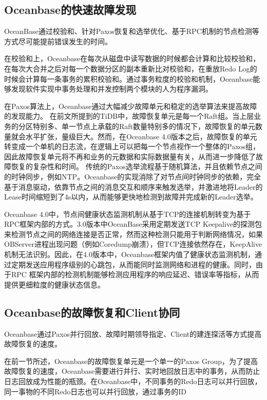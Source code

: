 \subsection{Oceanbase的快速故障发现}

OceanBase通过校验和、针对Paxos恢复和选举优化、基于RPC机制的节点检测等方式尽可能提前错误发生的时间。

在校验和上，Oceanbase在每次从磁盘中读写数据的时候都会计算和比较校验和，在每次大合并之后对每一个数据分区的副本重新比对校验和，在重放Redo Log的时候会计算每一条事务的累积校验和。通过事务粒度的校验和机制，Oceanbase能够发现软件实现中事务处理和并发控制两个模块的人为程序漏洞。

在Paxos算法上，Oceanbase通过大幅减少故障单元和稳定的选举算法来提高故障的发现能力。
在前文所提到的TiDB中，故障恢复单元是每一个Raft组。当上层业务的分区特别多、单一节点上承载的Raft数量特别多的情况下，故障恢复的单元数量就会水平扩张，量级巨大。然而，在Oceanbase 4.0版本之后，故障恢复的单元转变成一个单机的日志流，在逻辑上可以把每一个节点视作一个整体的Paxos组，因此故障恢复单元将不再和业务的元数据和实际数据量有关，从而进一步降低了故障恢复的复杂性和时间。
传统的Paxos选举流程基于随机算法，并且依赖节点之间的时钟同步，例如NTP。Oceanbase的实现消除了对节点间时钟同步的依赖，完全基于消息驱动，依靠节点之间的消息交互和顺序来触发选举，并激进地将Leader的Lease时间缩短到了4s以内，从而能够更快地检测到故障并完成新的Leader选举。

Oceanbase 4.0中，节点间健康状态监测机制从基于TCP的连接机制转变为基于RPC框架内部的方式。3.0版本中OceanBase采用定期发送TCP Keepalive的探测包来检测节点之间的网络连接是否正常，然而这种检测只能用于判断网络情况，如果OBServer进程出现问题（例如Coredump崩溃），但TCP连接依然存在，KeepAlive机制无法识别。因此，在4.0版本中，Oceanbase框架内值了健康状态监测机制，通过定期发送应用程序级别的心跳包，从而能同时监测网络和进程的健康。同时，由于RPC 框架内部的检测机制能够检测应用程序的响应延迟、错误率等指标，从而提供更细粒度的健康状态信息。

\subsection{Oceanbase的故障恢复和Client协同}

Oceanbase通过Paxos并行回放、故障时期领导指定、Client的建连探活等方式提高故障恢复的速度。

在前一节所述，Oceanbase的故障恢复单元是一个单一的Paxos Group，为了提高故障恢复的速度，Oceanbase需要进行并行、实时地回放日志中的事务，从而防止日志回放成为性能的瓶颈。在Oceanbase中，不同事务的Redo日志可以并行回放，同一事物的不同Redo日志也可以并行回放，通过事务的ID




